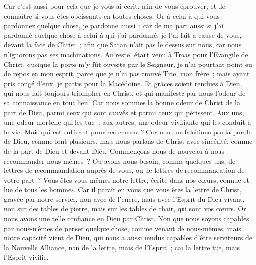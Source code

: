 \begin{multicols}{2}
Car c'est aussi pour cela que je vous ai écrit, afin de vous éprouver, et de connaître si vous êtes obéissants en toutes choses.
Or à celui à qui vous pardonnez quelque chose, je pardonne aussi~; car de ma part aussi si j'ai pardonné quelque chose à celui à qui j'ai pardonné, je l'ai fait à cause de vous, devant la face de Christ~;
afin que Satan n'ait pas le dessus sur nous, car nous n'ignorons pas ses machinations.
Au reste, étant venu à Troas pour l'Evangile de Christ, quoique la porte m'y fût ouverte par le Seigneur, je n'ai pourtant point eu de repos en mon esprit, parce que je n'ai pas trouvé Tite, mon frère~;
mais ayant pris congé d'eux, je partis pour la Macédoine.
Et grâces soient rendues à Dieu, qui nous fait toujours triompher en Christ, et qui manifeste par nous l'odeur de sa connaissance en tout lieu.
Car nous sommes la bonne odeur de Christ de la part de Dieu, parmi ceux qui sont sauvés et parmi ceux qui périssent.
Aux uns, une odeur mortelle qui les tue~; aux autres, une odeur vivifiante qui les conduit à la vie. Mais qui est suffisant pour ces choses~?
Car nous ne falsifions pas la parole de Dieu, comme font plusieurs, mais nous parlons de Christ avec sincérité, comme de la part de Dieu et devant Dieu.
\VerseOne{}Commençons-nous de nouveau à nous recommander nous-mêmes~? Ou avons-nous besoin, comme quelques-uns, de lettres de recommandation auprès de vous, ou de lettres de recommandation de votre part~?
Vous êtes vous-mêmes notre lettre, écrite dans nos cœurs, connue et lue de tous les hommes.
Car il paraît en vous que vous êtes la lettre de Christ, gravée par notre service, non avec de l'encre, mais avec l'Esprit du Dieu vivant, non sur des tables de pierre, mais sur les tables de chair, qui sont vos cœurs.
Or nous avons une telle confiance en Dieu par Christ.
Non que nous soyons capables par nous-mêmes de penser quelque chose, comme venant de nous-mêmes, mais notre capacité vient de Dieu,
qui nous a aussi rendus capables d'être serviteurs de la Nouvelle Alliance, non de la lettre, mais de l'Esprit~; car la lettre tue, mais l'Esprit vivifie.

\end{multicols}
